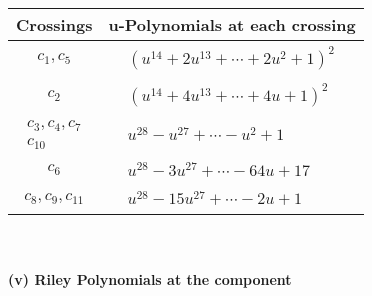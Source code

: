 \documentclass[1p]{elsarticle_modified}
\theoremstyle{definition}
\begin{document}
\begin{tabular}{m{50pt}|m{274pt}}
Crossings & \hspace{64pt}u-Polynomials at each crossing \\
\hline $$\begin{aligned}c_{1},c_{5}\end{aligned}$$&$\begin{aligned}
&(u^{14}+2 u^{13}+\cdots+2 u^2+1)^{2}
\end{aligned}$\\
\hline $$\begin{aligned}c_{2}\end{aligned}$$&$\begin{aligned}
&(u^{14}+4 u^{13}+\cdots+4 u+1)^{2}
\end{aligned}$\\
\hline $$\begin{aligned}c_{3},c_{4},c_{7}\\c_{10}\end{aligned}$$&$\begin{aligned}
&u^{28}- u^{27}+\cdots- u^2+1
\end{aligned}$\\
\hline $$\begin{aligned}c_{6}\end{aligned}$$&$\begin{aligned}
&u^{28}-3 u^{27}+\cdots-64 u+17
\end{aligned}$\\
\hline $$\begin{aligned}c_{8},c_{9},c_{11}\end{aligned}$$&$\begin{aligned}
&u^{28}-15 u^{27}+\cdots-2 u+1
\end{aligned}$\\
\hline
\end{tabular}\\~\\
\newpage\renewcommand{\arraystretch}{1}
\flushleft \textbf{(v) Riley Polynomials at the component}\newline \\
\end{document}
